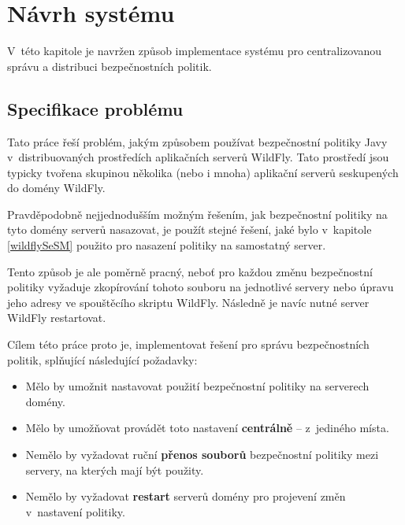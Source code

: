 \chapter{Návrh systému} \label{navrh}

V~této kapitole je navržen způsob implementace systému pro centralizovanou správu a distribuci bezpečnostních politik.

\section{Specifikace problému} \label{specifikaceProblemu}

Tato práce řeší problém, jakým způsobem používat bezpečnostní politiky Javy v~distribuovaných prostředích aplikačních serverů WildFly.
Tato prostředí jsou typicky tvořena skupinou několika (nebo i mnoha) aplikační serverů seskupených do domény WildFly.

Pravděpodobně nejjednodušším možným řešením, jak bezpečnostní politiky na tyto domény serverů nasazovat, je použít stejné řešení, jaké bylo v~kapitole \ref{wildflySeSM} použito pro nasazení politiky na samostatný server.

Tento způsob je ale poměrně pracný, neboť pro každou změnu bezpečnostní politiky vyžaduje zkopírování tohoto souboru na jednotlivé servery nebo úpravu jeho adresy ve spouštěcího skriptu WildFly. Následně je navíc nutné server WildFly restartovat.

Cílem této práce proto je, implementovat řešení pro správu bezpečnostních politik, splňující následující požadavky:

\begin{itemize}
  \item Mělo by umožnit nastavovat použití bezpečnostní politiky na serverech domény.
  \item Mělo by umožňovat provádět toto nastavení {\bf centrálně} -- z~jediného místa.
  \item Nemělo by vyžadovat ruční {\bf přenos souborů} bezpečnostní politiky mezi servery, na kterých mají být použity.
  \item Nemělo by vyžadovat {\bf restart} serverů domény pro projevení změn v~nastavení politiky.
\end{itemize}

